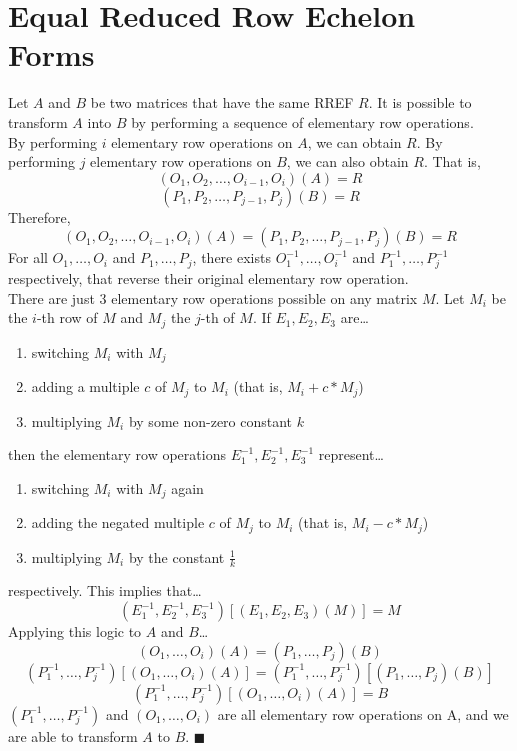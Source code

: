 \documentclass[11pt]{article}
\begin{document}
\section{Equal Reduced Row Echelon Forms}
Let \(A\) and \(B\) be two matrices that have the same RREF \(R\). It is possible to transform \(A\) into \(B\) by performing a sequence of elementary row operations.\\[10pt]
By performing \(i\) elementary row operations on \(A\), we can obtain \(R\). By performing \(j\) elementary row operations on \(B\), we can also obtain \(R\). That is,
\[
    (O_1, O_2, \ldots, O_{i - 1}, O_{i})(A) = R
\]
\[
    (P_1, P_2, \ldots, P_{j - 1}, P_{j})(B) = R
\]
Therefore,
\[
    (O_1, O_2, \ldots, O_{i - 1}, O_{i})(A) = (P_1, P_2, \ldots, P_{j - 1}, P_{j})(B) = R
\]
For all \(O_1, \ldots, O_i\) and \(P_1, \ldots, P_j\), there exists \(O_1^{-1}, \ldots, O_i^{-1}\) and \(P_1^{-1}, \ldots, P_j^{-1}\) respectively, that reverse their original elementary row operation.\\[10pt]
There are just 3 elementary row operations possible on any matrix \(M\). Let \(M_i\) be the \(i\)-th row of \(M\) and \(M_j\) the \(j\)-th of \(M\). If \(E_1, E_2, E_3\) are\dots
\begin{enumerate}
    \item switching \(M_i\) with \(M_j\)
    \item adding a multiple \(c\) of \(M_j\) to \(M_i\) (that is, \(M_i + c * M_j\))
    \item multiplying \(M_i\) by some non-zero constant \(k\)
\end{enumerate}
then the elementary row operations \(E_1^{-1}, E_2^{-1}, E_3^{-1}\) represent\dots
\begin{enumerate}
    \item switching \(M_i\) with \(M_j\) again
    \item adding the negated multiple \(c\) of \(M_j\) to \(M_i\) (that is, \(M_i - c * M_j\))
    \item multiplying \(M_i\) by the constant \(\frac{1}{k}\)
\end{enumerate}
respectively. This implies that\dots
\[
    (E_1^{-1}, E_2^{-1}, E_3^{-1})[(E_1, E_2, E_3)(M)] = M
\]
Applying this logic to \(A\) and \(B\)\dots
\[
    (O_1, \ldots, O_{i})(A) = (P_1, \ldots, P_{j})(B)
\]
\[
    (P_1^{-1}, \ldots, P_{j}^{-1})[(O_1, \ldots, O_{i})(A)] = (P_1^{-1}, \ldots, P_{j}^{-1})[(P_1, \ldots, P_{j})(B)]
\]
\[
    (P_1^{-1}, \ldots, P_{j}^{-1})[(O_1, \ldots, O_{i})(A)] = B
\]
\((P_1^{-1}, \ldots, P_{j}^{-1})\) and \((O_1, \ldots, O_{i})\) are all elementary row operations on A, and we are able to transform \(A\) to \(B\). $\blacksquare$
\end{document}
